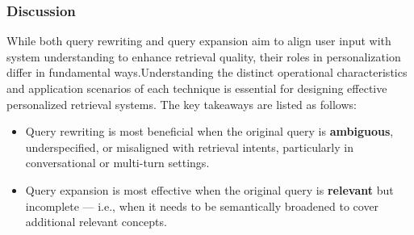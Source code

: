 \subsubsection{\textbf{Discussion}}
While both query rewriting and query expansion aim to align user input with system understanding to enhance retrieval quality, their roles in personalization differ in fundamental ways.Understanding the distinct operational characteristics and application scenarios of each technique is essential for designing effective personalized retrieval systems. The key takeaways are listed as follows: 
\begin{itemize}[leftmargin=*] 
    \item Query rewriting is most beneficial when the original query is \textbf{ambiguous}, underspecified, or misaligned with retrieval intents, particularly in conversational or multi-turn settings. 
    \item Query expansion is most effective when the original query is \textbf{relevant} but incomplete — i.e., when it needs to be semantically broadened to cover additional relevant concepts.
\end{itemize}

